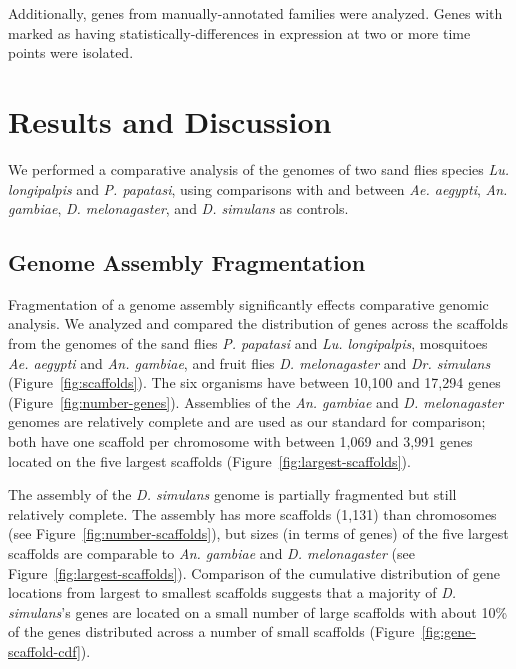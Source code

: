 Additionally, genes from manually-annotated families were analyzed.  Genes with marked as having statistically-differences in expression at two or more time points were isolated.

\section{Results and Discussion}
We performed a comparative analysis of the genomes of two sand flies species \emph{Lu. longipalpis} and \emph{P. papatasi}, using comparisons with and between \emph{Ae. aegypti}, \emph{An. gambiae}, \emph{D. melonagaster}, and \emph{D. simulans} as controls.

\subsection{Genome Assembly Fragmentation}
Fragmentation of a genome assembly significantly effects comparative genomic analysis.  We analyzed and compared the distribution of genes across the scaffolds from the genomes of the sand flies \emph{P. papatasi} and \emph{Lu. longipalpis}, mosquitoes \emph{Ae. aegypti} and \emph{An. gambiae}, and fruit flies \emph{D. melonagaster} and \emph{Dr. simulans} (Figure~\ref{fig:scaffolds}).  The six organisms have between 10,100 and 17,294 genes (Figure~\ref{fig:number-genes}).  Assemblies of the \emph{An. gambiae} and \emph{D. melonagaster} genomes are relatively complete and are used as our standard for comparison; both have one scaffold per chromosome with between 1,069 and 3,991 genes located on the five largest scaffolds (Figure~\ref{fig:largest-scaffolds}).

The assembly of the \emph{D. simulans} genome is partially fragmented but still relatively complete.  The assembly has more scaffolds (1,131) than chromosomes (see Figure~\ref{fig:number-scaffolds}), but sizes (in terms of genes) of the five largest scaffolds are comparable to \emph{An. gambiae} and \emph{D. melonagaster} (see Figure~\ref{fig:largest-scaffolds}).  Comparison of the cumulative distribution of gene locations from largest to smallest scaffolds suggests that a majority of \emph{D. simulans}'s genes are located on a small number of large scaffolds with about 10\% of the genes distributed across a number of small scaffolds (Figure~\ref{fig:gene-scaffold-cdf}).

